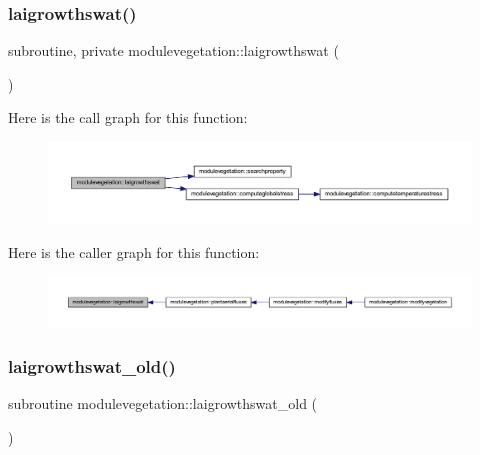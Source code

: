 \subsubsection{\texorpdfstring{laigrowthswat()}{laigrowthswat()}}
{\footnotesize\ttfamily subroutine, private modulevegetation\+::laigrowthswat (\begin{DoxyParamCaption}{ }\end{DoxyParamCaption})\hspace{0.3cm}{\ttfamily [private]}}

Here is the call graph for this function\+:\nopagebreak
\begin{figure}[H]
\begin{center}
\leavevmode
\includegraphics[width=350pt]{namespacemodulevegetation_a86662f45554df67ceb2fd66d1ff3afd1_cgraph}
\end{center}
\end{figure}
Here is the caller graph for this function\+:\nopagebreak
\begin{figure}[H]
\begin{center}
\leavevmode
\includegraphics[width=350pt]{namespacemodulevegetation_a86662f45554df67ceb2fd66d1ff3afd1_icgraph}
\end{center}
\end{figure}
\mbox{\label{namespacemodulevegetation_a0ec3ba9198a58232c38fd166c72810d5}} 
\subsubsection{\texorpdfstring{laigrowthswat\+\_\+old()}{laigrowthswat\_old()}}
{\footnotesize\ttfamily subroutine modulevegetation\+::laigrowthswat\+\_\+old (\begin{DoxyParamCaption}{ }\end{DoxyParamCaption})\hspace{0.3cm}{\ttfamily [private]}}

